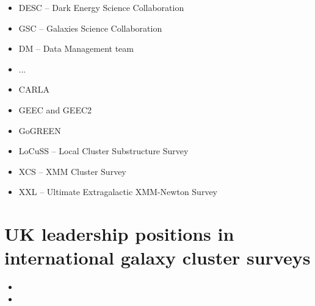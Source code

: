 \documentclass[a4paper,11pt]{article}
\begin{document}
\begin{itemize}
\item DESC -- Dark Energy Science Collaboration
\item GSC -- Galaxies Science Collaboration
\item DM -- Data Management team
\item ...
\item CARLA
\item GEEC and GEEC2
\item GoGREEN
\item LoCuSS -- Local Cluster Substructure Survey
\item XCS -- XMM Cluster Survey
\item XXL -- Ultimate Extragalactic XMM-Newton Survey
\end{itemize}

\section{UK leadership positions in international galaxy cluster surveys}

\begin{itemize}
\item
\item
\end{itemize}
\end{document}
